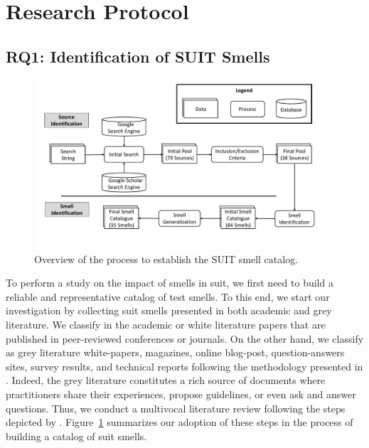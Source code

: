 \section{Research Protocol}
\label{sec:methodology}

\subsection{RQ1: Identification of SUIT Smells}
\label{sec:experience-design-smells-collection}
%
\begin{figure}
\centering
\includegraphics[width=\linewidth]{figures/smells/smell-catalgogue-process.pdf}
\caption{Overview of the process to establish the SUIT smell catalog.}  
\label{fig:smell-catalog-process}
\end{figure}

To perform a study on the impact of smells in \gls{suit}, we first need to build a reliable and representative catalog of test smells. To this end, we start our investigation by collecting \gls{suit} smells presented in both academic and grey literature. 
We classify in the academic or white literature papers that are published in peer-reviewed conferences or journals. On the other hand, we classify as grey literature white-papers, magazines, online blog-post, question-answers sites, survey results, and technical reports following the methodology presented in \textcite{Ricca2021}. Indeed, the grey literature constitutes a rich source of documents where practitioners share their experiences, propose guidelines, or even ask and answer questions. Thus, we conduct a multivocal literature review following the steps depicted by \textcite{Garousi2018}. 
Figure~\ref{fig:smell-catalog-process} summarizes our adoption of these steps in the process of building a catalog of \gls{suit} smells.

